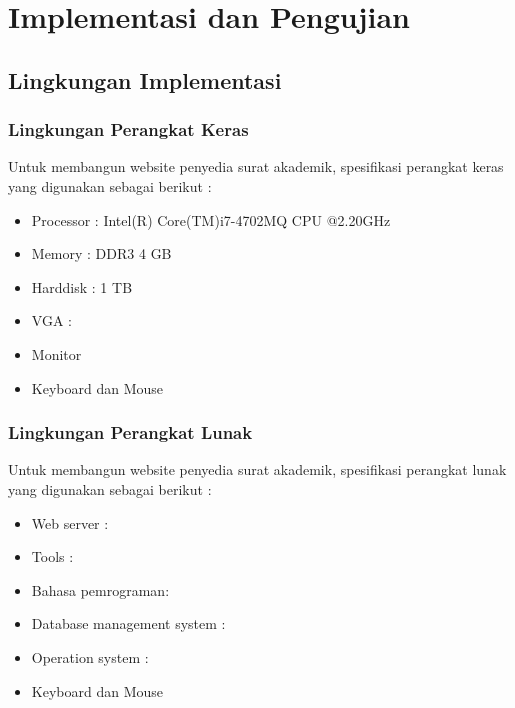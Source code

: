 \chapter{Implementasi dan Pengujian}
\label{chap:implementasi_dan_pengujian}

\section{Lingkungan Implementasi}
\label{sec:lingkungan_implementasi}

\subsection{Lingkungan Perangkat Keras}
\label{sec:lingkungan_perangkat_keras}
Untuk membangun website penyedia surat akademik, spesifikasi perangkat keras yang digunakan sebagai berikut :
\begin{itemize}
	\item Processor : Intel(R) Core(TM)i7-4702MQ CPU @2.20GHz
	\item Memory : DDR3 4 GB
	\item Harddisk : 1 TB
	\item VGA :
	\item Monitor
	\item Keyboard dan Mouse
\end{itemize}

\subsection{Lingkungan Perangkat Lunak}
\label{sec:lingkungan_perangkat_lunak}
Untuk membangun website penyedia surat akademik, spesifikasi perangkat lunak yang digunakan sebagai berikut :
\begin{itemize}
	\item Web server : 
	\item Tools : 
	\item Bahasa pemrograman: 
	\item Database management system :
	\item Operation system : 
	\item Keyboard dan Mouse
\end{itemize}